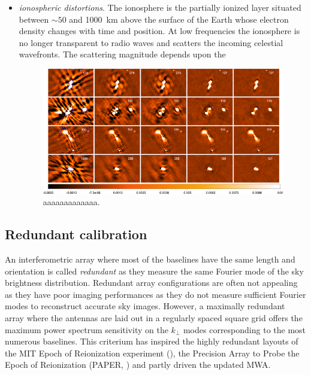 \begin{itemize}
\item {\it ionospheric distortions}. The ionosphere is the partially ionized layer situated between $\sim 50$ and 1000~km above the surface of the Earth whose electron density changes with time and position. At low frequencies the ionosphere is no longer transparent to radio waves and scatters the incoming celestial wavefronts. The scattering magnitude depends upon the 
\begin{figure}[]
\begin{center}
\includegraphics[width=1.\textwidth]{Bernardi/ionospheric_calibration}
\end{center}
\caption{aaaaaaaaaaaaa.}
\label{fig:fig5}
\end{figure}
\end{itemize}



\subsection{Redundant calibration}

An interferometric array where most of the baselines have the same length and orientation is called {\it redundant} as they measure the same Fourier mode of the sky brightness distribution. Redundant array configurations are often not appealing as they have poor imaging performances as they do not measure sufficient Fourier modes to reconstruct accurate sky images. However, a maximally redundant array where the antennas are laid out in a regularly spaced square grid offers the maximum power spectrum sensitivity on the $k_\perp$ modes corresponding to the most numerous baselines. This criterium has inspired the highly redundant layouts of the MIT Epoch of Reionization experiment (\cite{zheng14}), the Precision Array to Probe the Epoch of Reionization (PAPER, \cite{parsons12b}) and partly driven the updated MWA.

